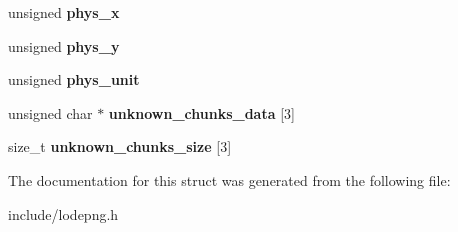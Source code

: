 \begin{DoxyCompactItemize}
\item 
unsigned {\bfseries phys\+\_\+x}\hypertarget{struct_lode_p_n_g_info_a1593fa6e1acc93f3b9de51c340bef94d}{}\label{struct_lode_p_n_g_info_a1593fa6e1acc93f3b9de51c340bef94d}

\item 
unsigned {\bfseries phys\+\_\+y}\hypertarget{struct_lode_p_n_g_info_a52ad7a105244d00f1e91c489eaf53f97}{}\label{struct_lode_p_n_g_info_a52ad7a105244d00f1e91c489eaf53f97}

\item 
unsigned {\bfseries phys\+\_\+unit}\hypertarget{struct_lode_p_n_g_info_ad6f2171d9f87716e5010f6c5352f9855}{}\label{struct_lode_p_n_g_info_ad6f2171d9f87716e5010f6c5352f9855}

\item 
unsigned char $\ast$ {\bfseries unknown\+\_\+chunks\+\_\+data} \mbox{[}3\mbox{]}\hypertarget{struct_lode_p_n_g_info_a8347476da7fc2fc6af4ec7ed44b638c6}{}\label{struct_lode_p_n_g_info_a8347476da7fc2fc6af4ec7ed44b638c6}

\item 
size\+\_\+t {\bfseries unknown\+\_\+chunks\+\_\+size} \mbox{[}3\mbox{]}\hypertarget{struct_lode_p_n_g_info_a25a81d760759bd0383ae5a81ba83911d}{}\label{struct_lode_p_n_g_info_a25a81d760759bd0383ae5a81ba83911d}

\end{DoxyCompactItemize}


The documentation for this struct was generated from the following file\+:\begin{DoxyCompactItemize}
\item 
include/lodepng.\+h\end{DoxyCompactItemize}
